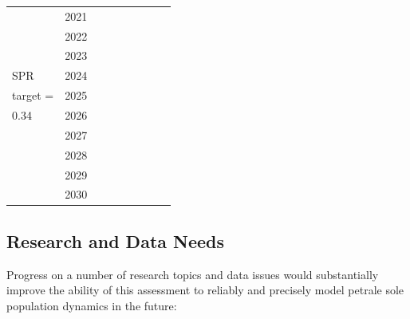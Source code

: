 \documentclass[12pt,]{article}
\begin{document}
\begin{table}[ht]
{\begin{tabular}{l|cc|>{\centering}p{.7in}c|>{\centering}p{.7in}c|>{\centering}p{.7in}c}
   \hline
 & 2021 &  &  &  &  &  &  &  \\ 
   & 2022 &  &  &  &  &  &  &  \\ 
   & 2023 &  &  &  &  &  &  &  \\ 
  SPR  & 2024 &  &  &  &  &  &  &  \\ 
  target =  & 2025 &  &  &  &  &  &  &  \\ 
  0.34 & 2026 &  &  &  &  &  &  &  \\ 
   & 2027 &  &  &  &  &  &  &  \\ 
   & 2028 &  &  &  &  &  &  &  \\ 
   & 2029 &  &  &  &  &  &  &  \\ 
   & 2030 &  &  &  &  &  &  &  \\ 
   \hline
\end{tabular}
}
\end{table}

\FloatBarrier

\subsection*{Research and Data Needs}\label{research-and-data-needs}

Progress on a number of research topics and data issues would
substantially improve the ability of this assessment to reliably and
precisely model petrale sole population dynamics in the future:
\end{document}

